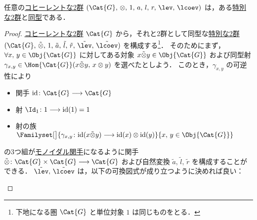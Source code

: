 \documentclass[TQFT_main]{subfiles}
\begin{document}
\begin{myprop}[label=prop:special2G]{}
    任意の\hyperref[def:W2G-C2G]{コヒーレントな2群} $(\Cat{G},\, \otimes,\, 1,\, a,\, l,\, r,\, \lev,\, \lcoev)$ は，ある\hyperref[def:special2G]{特別な2群}と\hyperref[def:hom2G]{同型}である．
\end{myprop}

\begin{proof}
    \hyperref[def:W2G-C2G]{コヒーレントな2群} $\Cat{G}$ から，それと2群として同型な\hyperref[def:special2G]{特別な2群} $(\Cat{G},\, \tilde{\otimes},\, 1,\, \tilde{a},\, \tilde{l},\, \tilde{r},\, \tilde{\lev},\, \tilde{\lcoev})$ を構成する\footnote{下地になる圏 $\Cat{G}$ と単位対象 $1$ は同じものをとる．}．
    そのためにまず，$\forall x,\, y \in \Obj{\Cat{G}}$ に対してある対象 $x \tilde{\otimes} y \in \Obj{\Cat{G}}$ および同型射 $\gamma_{x,y} \in \Hom{\Cat{G}}(x \tilde{\otimes}y,\, x\otimes y)$ を選べたとしよう．
    このとき，$\gamma_{x,y}$ の可逆性により
    \begin{itemize}
        \item 関手 $\mathrm{id} \colon \Cat{G} \lto \Cat{G}$
        \item 射 $\Id_1 \colon 1 \lto \mathrm{id}(1) = 1$
        \item 射の族 $\Familyset[\big]{\gamma_{x,y} \colon \mathrm{id}(x \tilde{\otimes} y) \lto \mathrm{id}(x) \otimes \mathrm{id}(y) }{x,\, y \in \Obj{\Cat{G}}}$
    \end{itemize}
    の3つ組が\hyperref[def:monoidal-functior]{モノイダル関手}になるように関手 $\tilde{\otimes} \colon \Cat{G} \times \Cat{G} \lto \Cat{G}$ および自然変換 $\tilde{a},\, \tilde{l},\, \tilde{r}$ を構成することができる．
    $\tilde{\lev},\, \tilde{\lcoev}$ は，以下の可換図式が成り立つように決めれば良い：
    \begin{center}


\end{center}
\end{proof}
\end{document}
